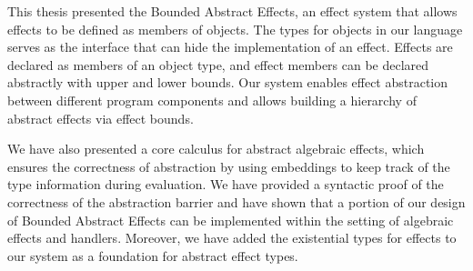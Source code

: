 This thesis presented the Bounded Abstract Effects, an effect system that allows effects to be defined as members of objects. The types for objects in our language serves as the interface that can hide the implementation of an effect. Effects are declared as members of an object type, and effect members can be declared abstractly with upper and lower bounds. Our system enables effect abstraction between different program components and allows building a hierarchy of abstract effects via effect bounds.

We have also presented a core calculus for abstract algebraic effects, which ensures the correctness of abstraction by using embeddings to keep track of the type information during evaluation. We have provided a syntactic proof of the correctness of the abstraction barrier and have shown that a portion of our design of Bounded Abstract Effects  can be implemented within the setting of algebraic effects and handlers.  Moreover, we have added the existential types for effects to our system as a foundation for abstract effect types. 






